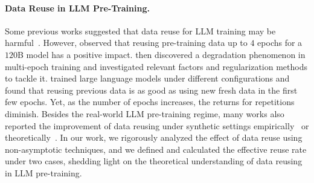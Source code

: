 \iffalse
\paragraph{Data Reuse in LLM Pre-Training.} 

Some previous works suggested that data reuse for LLM training may be harmful~\citep{lee2021deduplicating,hoffmann2022training,hernandez2022scaling,wang2023data}. However, \citet{taylor2022galactica} observed that reusing pre-training data up to $4$ epochs for a $120$B model has a positive impact. \citet{xue2023repeat} then discovered a degradation phenomenon in multi-epoch training and investigated relevant factors and regularization methods to tackle it. \citet{muennighoff2023scaling} trained large language models under different configurations and found that reusing previous data is as good as using new fresh data in the first few epochs. Yet, as the number of epochs increases, the returns for repetitions diminish. 
Besides the real-world LLM pre-training regime, many works also reported the improvement of data reusing under synthetic settings empirically~\citep{charton2024emergent,kazdan2024collapse} or theoretically~\citep{zucchet2025emergence,dandi2024benefitsreusingbatchesgradient,arnaboldi2025repetitaiuvantdatarepetition}.  
In our work, we rigorously analyzed the effect of data reuse using non-asymptotic techniques, and we defined and calculated the effective reuse rate under two cases, shedding light on the theoretical understanding of data reusing in LLM pre-training.

